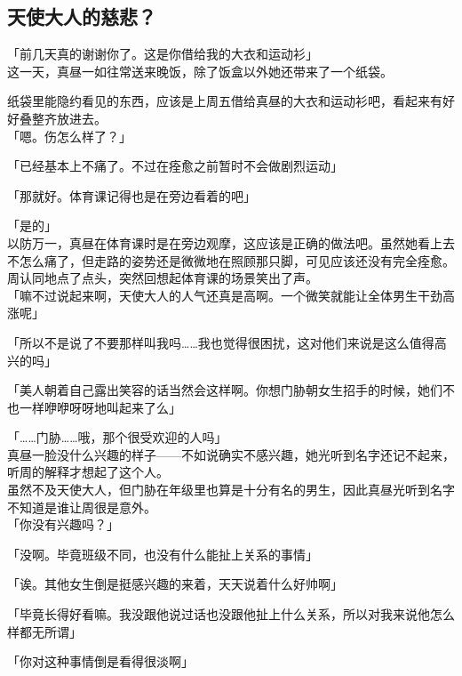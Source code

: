 \subsection{天使大人的慈悲？}

「前几天真的谢谢你了。这是你借给我的大衣和运动衫」\\

这一天，真昼一如往常送来晚饭，除了饭盒以外她还带来了一个纸袋。

纸袋里能隐约看见的东西，应该是上周五借给真昼的大衣和运动衫吧，看起来有好好叠整齐放进去。\\

「嗯。伤怎么样了？」

「已经基本上不痛了。不过在痊愈之前暂时不会做剧烈运动」

「那就好。体育课记得也是在旁边看着的吧」

「是的」\\

以防万一，真昼在体育课时是在旁边观摩，这应该是正确的做法吧。虽然她看上去不怎么痛了，但走路的姿势还是微微地在照顾那只脚，可见应该还没有完全痊愈。\\

周认同地点了点头，突然回想起体育课的场景笑出了声。\\

「嘛不过说起来啊，天使大人的人气还真是高啊。一个微笑就能让全体男生干劲高涨呢」

「所以不是说了不要那样叫我吗……我也觉得很困扰，这对他们来说是这么值得高兴的吗」

「美人朝着自己露出笑容的话当然会这样啊。你想门胁朝女生招手的时候，她们不也一样咿咿呀呀地叫起来了么」

「……门胁……哦，那个很受欢迎的人吗」\\

真昼一脸没什么兴趣的样子——不如说确实不感兴趣，她光听到名字还记不起来，听周的解释才想起了这个人。\\

虽然不及天使大人，但门胁在年级里也算是十分有名的男生，因此真昼光听到名字不知道是谁让周很是意外。\\

「你没有兴趣吗？」

「没啊。毕竟班级不同，也没有什么能扯上关系的事情」

「诶。其他女生倒是挺感兴趣的来着，天天说着什么好帅啊」

「毕竟长得好看嘛。我没跟他说过话也没跟他扯上什么关系，所以对我来说他怎么样都无所谓」

「你对这种事情倒是看得很淡啊」

